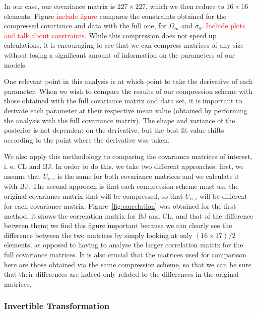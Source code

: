 \documentclass[twocolumn]{\docclass}
\newcommand{\rf}[1]{\ref{fig:#1}}
\begin{document}
In our case, our covariance matrix is  $227 \times 227$, which we then reduce to $16 \times 16$ elements. Figure \textcolor{red}{include figure} compares the constraints obtained for the compressed covariance and data with the full one, for $\Omega_m$ and $\sigma_8$.  \textcolor{red}{Include plots and talk about constraints.} While this compression does not speed up calculations, it is encouraging to see that we can compress matrices of any size without losing a significant amount of information on the parameters of our models. 

One relevant point in this analysis is at which point to take the derivative of each parameter. When we wish to compare the results of our compression scheme with those obtained with the full covariance matrix and data set, it is important to derivate each parameter at their respective mean value (obtained by performing the analysis with the full covariance matrix). The shape and variance of the posterior is not dependent on the derivative, but the best fit value shifts according to the point where the derivative was taken.

We also apply this methodology to comparing the covariance matrices of interest, i. e. CL and BJ. In order to do this, we take two different approaches: first, we assume that $U_{\alpha, i}$ is the same for both covariance matrices and we calculate it with BJ. The second approach is that each compression scheme must use the original covariance matrix that will be compressed, so that $U_{\alpha, i}$ will be different for each covariance matrix. Figure~\rf{correlation} was obtained for the first method, it shows the correlation matrix for BJ and CL, and that of the difference between them; we find this figure important because we can clearly see the difference between the two matrices by simply looking at only $(16 \times 17)/2$ elements, as opposed to having to analyse the larger correlation matrix for the full covariance matrices. It is also crucial that the matrices used for comparison here are those obtained via the same compression scheme, so that we can be sure that their differences are indeed only related to the differences in the original matrices.

\subsubsection{Invertible Transformation}
\end{document}
